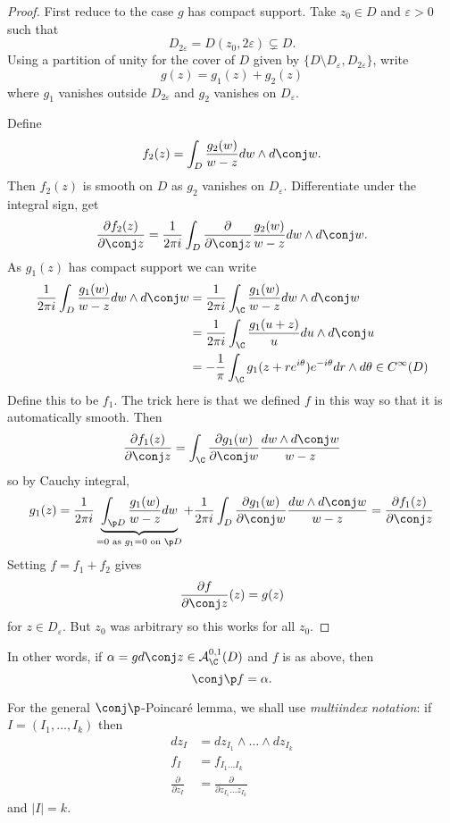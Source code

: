 \documentclass[a4paper]{article}
\newcommand{\w}{\wedge} %
\begin{document}
\begin{proof}
  First reduce to the case \(g\) has compact support. Take \(z_0 \in D\) and \(\varepsilon > 0\) such that
  \[
    D_{2\varepsilon} = D(z_0, 2\varepsilon) \subsetneq D.
  \]
  Using a partition of unity for the cover of \(D\) given by \(\{D \setminus D_\varepsilon, D_{2\varepsilon}\}\), write
  \[
    g(z) = g_1(z) + g_2(z)
  \]
  where \(g_1\) vanishes outside \(D_{2\varepsilon}\) and \(g_2\) vanishes on \(D_\varepsilon\).

  Define
  \[
    f_2(z) = \int_D \frac{g_2(w)}{w - z} dw \w d \conj w.
  \]
  Then \(f_2(z)\) is smooth on \(D\) as \(g_2\) vanishes on \(D_\varepsilon\). Differentiate under the integral sign, get
  \[
    \frac{\partial f_2(z)}{\partial \conj z} = \frac{1}{2\pi i} \int_D \frac{\partial  }{\partial \conj z} \frac{g_2(w)}{w - z} dw \w d \conj w.
  \]
  As \(g_1(z)\) has compact support we can write
  \begin{align*}
    \frac{1}{2\pi i} \int_D \frac{g_1(w)}{w - z} dw \w d\conj w
    &= \frac{1}{2\pi i} \int_\C \frac{g_1(w)}{w - z} dw \w d \conj w \\
    &= \frac{1}{2\pi i} \int_\C \frac{g_1(u + z)}{u} du \w d \conj u \\
    &= -\frac{1}{\pi} \int_\C g_1(z + re^{i\theta}) e^{-i\theta} dr \w d\theta \in C^\infty(D)
  \end{align*}
  Define this to be \(f_1\). The trick here is that we defined \(f\) in this way so that it is automatically smooth. Then
  \[
    \frac{\partial f_1(z)}{\partial \conj z}
    = \int_\C \frac{\partial g_1(w)}{\partial \conj w} \frac{dw \w d \conj w}{w - z}
  \]
  so by Cauchy integral,
  \[
    g_1(z)
    = \frac{1}{2\pi i} \underbrace{\int_{\p D} \frac{g_1(w)}{w - z}dw}_{= 0 \text{ as } g_1 = 0 \text{ on } \p D} + \frac{1}{2\pi i} \int_D \frac{\partial g_1(w)}{\partial \conj w} \frac{dw \w d\conj w}{w - z}
    = \frac{\partial f_1(z)}{\partial \conj z}
  \]
  Setting \(f = f_1 + f_2\) gives
  \[
    \frac{\partial f}{\partial \conj z}(z) = g(z)
  \]
  for \(z \in D_\varepsilon\). But \(z_0\) was arbitrary so this works for all \(z_0\).
\end{proof}

In other words, if \(\alpha = g d \conj z \in \mathcal A_\C^{0, 1}(D)\) and \(f\) is as above, then
\[
  \conj \p f = \alpha.
\]

For the general \(\conj \p\)-Poincaré lemma, we shall use \emph{multiindex notation}: if \(I = (I_1, \dots, I_k)\) then
\begin{align*}
  dz_I &= dz_{I_1} \w \dots \w dz_{I_k} \\
  f_I &= f_{I_1 \dots I_k} \\
  \frac{\partial  }{\partial z_I} &= \frac{\partial }{\partial z_{I_1} \dots z_{I_k}}
\end{align*}
and \(|I| = k\).
\end{document}

